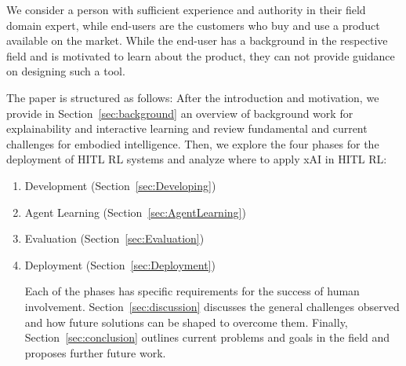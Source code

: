 \documentclass[twoside,11pt]{article}
\begin{document}
We consider a person with sufficient experience and authority in their field domain expert, while end-users are the customers who buy and use a product available on the market. While the end-user has a background in the respective field and is motivated to learn about the product, 
they can not provide guidance on designing such a tool.

The paper is structured as follows: After the introduction and motivation, we provide in Section~\ref{sec:background} an overview of background work for explainability and interactive learning and review fundamental and current challenges for embodied intelligence. Then, we explore the four phases for the deployment of HITL RL systems and analyze where to apply xAI in HITL RL:
\begin{enumerate}
	\item Development (Section~\ref{sec:Developing})
	\item Agent Learning (Section~\ref{sec:AgentLearning})
	\item Evaluation (Section~\ref{sec:Evaluation})
	\item Deployment (Section~\ref{sec:Deployment})

Each of the phases has specific requirements for the success of human involvement. Section~\ref{sec:discussion} discusses the general challenges observed and how future solutions can be shaped to overcome them. Finally, Section~\ref{sec:conclusion} outlines current problems and goals in the field and proposes further future work.


\end{enumerate}
\end{document}
